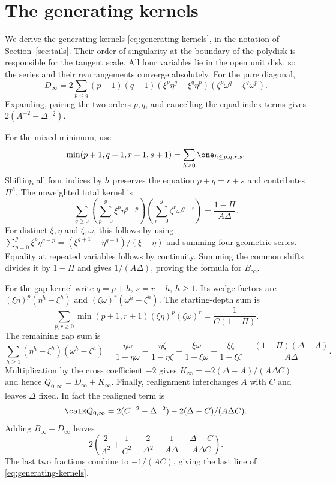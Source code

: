 \section{The generating kernels}\label{app:kernels}
We derive the generating kernels \eqref{eq:generating-kernels}, in the notation of
Section~\ref{sec:tails}. Their order of singularity at the boundary of
the polydisk is responsible for the tangent scale. All four variables
lie in the open unit disk, so the series and their rearrangements
converge absolutely. For the pure diagonal,
\[
 D_\infty=2\sum_{p<q}(p+1)(q+1)
     (\xi^p\eta^q-\xi^q\eta^p)(\zeta^p\omega^q-\zeta^q\omega^p).
\]
Expanding, pairing the two orders $p,q$, and cancelling the equal-index
terms gives $2(A^{-2}-\Delta{}^{-2})$.

For the mixed minimum, use
\[
 \min(p+1,q+1,r+1,s+1)
   =\sum_{h\ge0}\one_{h\le p,q,r,s}.
\]
Shifting all four indices by $h$ preserves the equation $p+q=r+s$
and contributes $\Pi^h$. The unweighted total kernel is
\[
 \sum_{g\ge0}\left(\sum_{p=0}^g \xi^p\eta^{g-p}\right)
                    \left(\sum_{r=0}^g \zeta^r\omega^{g-r}\right)
     =\frac{1-\Pi}{A\Delta{}}.
\]
For distinct $\xi,\eta$ and $\zeta,\omega$, this follows by using
$\sum_{p=0}^g \xi^p\eta^{g-p}=(\xi^{g+1}-\eta^{g+1})/(\xi-\eta)$ and summing four
geometric series. Equality at repeated variables follows by continuity.
Summing the common shifts divides it by $1-\Pi$ and gives
$1/(A\Delta{})$, proving the formula for $B_\infty$.

For the gap kernel write $q=p+h$, $s=r+h$, $h\ge1$. Its wedge factors
are $(\xi\eta)^p(\eta^h-\xi^h)$ and $(\zeta\omega)^r(\omega^h-\zeta^h)$. The starting-depth sum is
\[
 \sum_{p,r\ge0}\min(p+1,r+1)(\xi\eta)^p(\zeta\omega)^r
                       =\frac1{C(1-\Pi)}.
\]
The remaining gap sum is
\[
 \sum_{h\ge1}(\eta^h-\xi^h)(\omega^h-\zeta^h)
 =\frac{\eta\omega}{1-\eta\omega}-\frac{\eta\zeta}{1-\eta\zeta}
  -\frac{\xi\omega}{1-\xi\omega}+\frac{\xi\zeta}{1-\xi\zeta}
 =\frac{(1-\Pi)(\Delta{}-A)}{A\Delta{}}.
\]
Multiplication by the cross coefficient $-2$ gives
$K_\infty=-2(\Delta{}-A)/(A\Delta{}C)$ and hence $Q_{0,\infty}=D_\infty+K_\infty$.
Finally, realignment interchanges $A$ with $C$ and leaves $\Delta{}$ fixed.
In fact the realigned term is
\[
 \calR Q_{0,\infty}=2(C^{-2}-\Delta{}^{-2})
                         -2(\Delta{}-C)/(A\Delta{}C).
\]
Adding $B_\infty+D_\infty$ leaves
\[
 2\left(\frac2{A^2}+\frac1{C^2}-\frac2{\Delta{}^2}
        -\frac1{A\Delta{}}-\frac{\Delta{}-C}{A\Delta{}C}\right).
\]
The last two fractions combine to $-1/(AC)$, giving the last line of
\eqref{eq:generating-kernels}.
